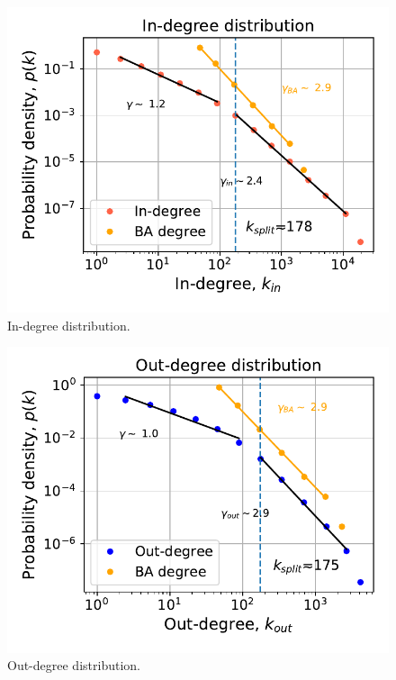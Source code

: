 \documentclass[11pt, twoside]{report}
\begin{document}
\begin{minipage}[b]{0.5\textwidth}
   \centering
    \begin{figure}[H]
      \includegraphics[width=\textwidth]{../../scripts/network_analysis/imgs/in_degree_distribution.pdf}
          \caption{In-degree distribution.}
        \label{fig:in_degree}
\end{figure}
\end{minipage}
\begin{minipage}[b]{0.5\textwidth}
  \begin{figure}[H]
  \centering
  \includegraphics[width=\textwidth]{../../scripts/network_analysis/imgs/out_degree_distribution.pdf}
        \caption{Out-degree distribution.}
\label{fig:out_degree}
\end{figure}
\end{minipage}
\end{document}
